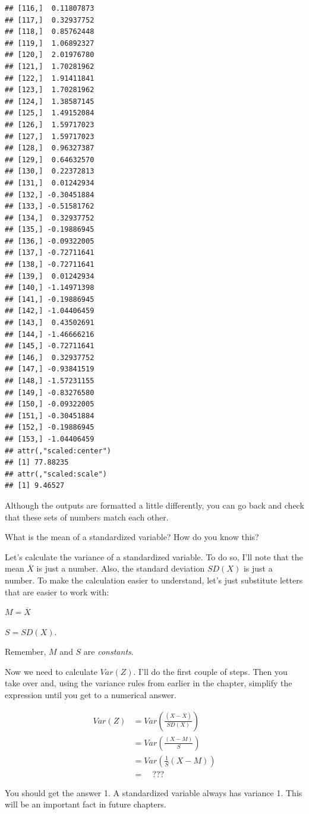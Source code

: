 \documentclass[
]{book}
\begin{document}
\begin{verbatim}
## [116,]  0.11807873
## [117,]  0.32937752
## [118,]  0.85762448
## [119,]  1.06892327
## [120,]  2.01976780
## [121,]  1.70281962
## [122,]  1.91411841
## [123,]  1.70281962
## [124,]  1.38587145
## [125,]  1.49152084
## [126,]  1.59717023
## [127,]  1.59717023
## [128,]  0.96327387
## [129,]  0.64632570
## [130,]  0.22372813
## [131,]  0.01242934
## [132,] -0.30451884
## [133,] -0.51581762
## [134,]  0.32937752
## [135,] -0.19886945
## [136,] -0.09322005
## [137,] -0.72711641
## [138,] -0.72711641
## [139,]  0.01242934
## [140,] -1.14971398
## [141,] -0.19886945
## [142,] -1.04406459
## [143,]  0.43502691
## [144,] -1.46666216
## [145,] -0.72711641
## [146,]  0.32937752
## [147,] -0.93841519
## [148,] -1.57231155
## [149,] -0.83276580
## [150,] -0.09322005
## [151,] -0.30451884
## [152,] -0.19886945
## [153,] -1.04406459
## attr(,"scaled:center")
## [1] 77.88235
## attr(,"scaled:scale")
## [1] 9.46527
\end{verbatim}

Although the outputs are formatted a little differently, you can go back and check that these sets of numbers match each other.

What is the mean of a standardized variable? How do you know this?

Let's calculate the variance of a standardized variable. To do so, I'll note that the mean \(\overline{X}\) is just a number. Also, the standard deviation \(SD(X)\) is just a number. To make the calculation easier to understand, let's just substitute letters that are easier to work with:

\(M = \overline{X}\)

\(S = SD(X)\).

Remember, \(M\) and \(S\) are \emph{constants}.

Now we need to calculate \(Var(Z)\). I'll do the first couple of steps. Then you take over and, using the variance rules from earlier in the chapter, simplify the expression until you get to a numerical answer.

\begin{align}
Var(Z) &= Var\left(\frac{\left(X - \overline{X}\right)}{SD(X)}\right) \\
    &= Var\left(\frac{\left(X - M\right)}{S}\right) \\
    &= Var\left(\frac{1}{S}\left(X - M\right)\right) \\
    &= \quad ???
\end{align}

You should get the answer 1. A standardized variable always has variance 1. This will be an important fact in future chapters.
\end{document}
